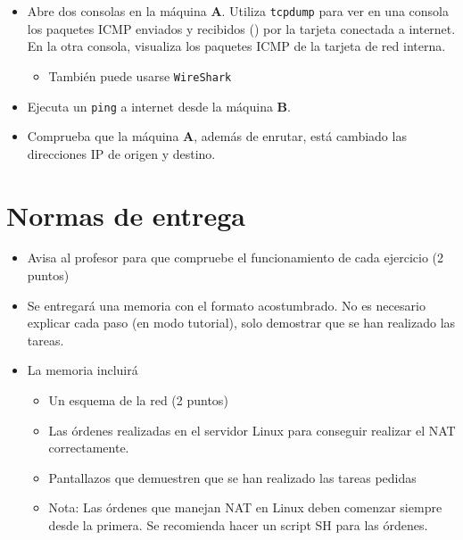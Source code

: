 \begin{homeworkProblem}
  \begin{itemize}
  \item Abre dos consolas en la máquina \textbf{A}. Utiliza \texttt{tcpdump} para ver en una consola los paquetes ICMP enviados y recibidos () por la tarjeta conectada a internet. En la otra consola, visualiza los paquetes ICMP de la tarjeta de red interna.
    \begin{itemize}
    \item También puede usarse \texttt{WireShark}
    \end{itemize}
  \item Ejecuta un \texttt{ping} a internet desde la máquina \textbf{B}.
  \item Comprueba que la máquina \textbf{A}, además de enrutar, está cambiado las direcciones IP de origen y destino.
  \end{itemize}
\end{homeworkProblem}


\section{Normas de entrega}
\begin{itemize}
\item Avisa al profesor para que compruebe el funcionamiento de cada ejercicio (2 puntos)
\item Se entregará una memoria con el formato acostumbrado. No es necesario explicar cada paso (en modo tutorial), solo demostrar que se han realizado las tareas.
\item La memoria incluirá

  \begin{itemize}
  \item Un esquema de la red (2 puntos)
  \item Las órdenes realizadas en el servidor Linux para conseguir realizar el NAT correctamente.
  \item Pantallazos que demuestren que se han realizado las tareas pedidas
  \item
    \begin{small}
      Nota: Las órdenes que manejan NAT en Linux deben comenzar siempre desde la primera. Se recomienda hacer un script SH para las órdenes.
    \end{small}
    
  \end{itemize}

\end{itemize}


